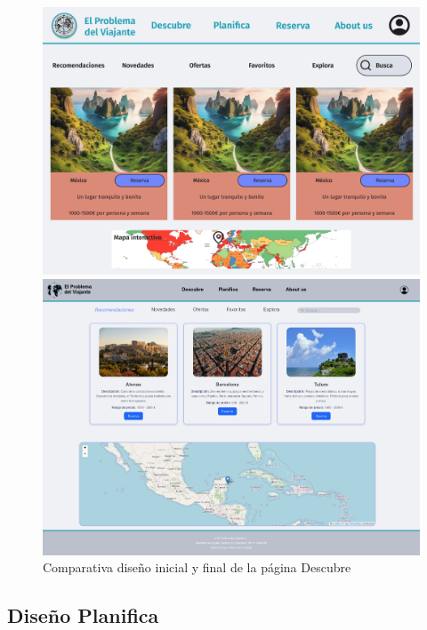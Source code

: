 \documentclass[11pt, a4paper]{book}
\begin{document}
	\begin{figure} [H]
		\centering
		\begin{minipage}[c]{0.45\textwidth}
			\centering
			\includegraphics[width=\textwidth]{mockup-descubre.png}
		\end{minipage}
		\hspace{0.04\textwidth}
		\begin{minipage}[c]{0.45\textwidth}
			\centering
			\includegraphics[width=\textwidth]{full-2.png}
		\end{minipage}
		\caption{Comparativa diseño inicial y final de la página Descubre}
	\end{figure}
	
	
	\subsection{Diseño Planifica}
	
\end{document}
